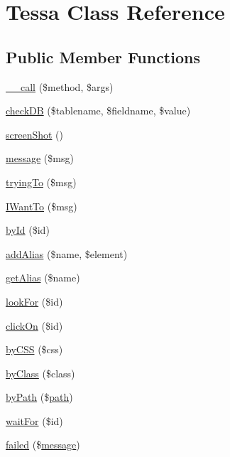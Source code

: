 \hypertarget{classTessa}{}\section{Tessa Class Reference}
\label{classTessa}
\subsection*{Public Member Functions}
\begin{DoxyCompactItemize}
\item 
\hyperlink{classTessa_ac4ec71dc20d7f8c1494c56115eeb534d}{\+\_\+\+\_\+call} (\$method, \$args)
\item 
\hyperlink{classTessa_a54a265707312dd6c5ec290d4877ec05a}{check\+D\+B} (\$tablename, \$fieldname, \$value)
\item 
\hyperlink{classTessa_a410bf71687fffc9d1c5bd674df222eba}{screen\+Shot} ()
\item 
\hyperlink{classTessa_a7e4c039b8228d75810747b96b5062366}{message} (\$msg)
\item 
\hyperlink{classTessa_ac95db31344f3edd1c2951ce6e0f585db}{trying\+To} (\$msg)
\item 
\hyperlink{classTessa_a9996261064c450e61e6530ec0441b945}{I\+Want\+To} (\$msg)
\item 
\hyperlink{classTessa_ae146b22ed7951b61143efd7073d0ea2c}{by\+Id} (\$id)
\item 
\hyperlink{classTessa_aafeac59dfa47fb1501a521bcf9438f15}{add\+Alias} (\$name, \$element)
\item 
\hyperlink{classTessa_a5bf96722ac914ff51e848b14891fb2c0}{get\+Alias} (\$name)
\item 
\hyperlink{classTessa_a1d6ad14ab105a7524cb4f08bfd1d73ca}{look\+For} (\$id)
\item 
\hyperlink{classTessa_a983d3117227db7bf254466936aa8a989}{click\+On} (\$id)
\item 
\hyperlink{classTessa_af0f1f7c19711f0527bd1372a096038bd}{by\+C\+S\+S} (\$css)
\item 
\hyperlink{classTessa_ac535720770b7bed0ea1120aa121c7ea8}{by\+Class} (\$class)
\item 
\hyperlink{classTessa_a91a3e45138fd2f8325a2a94c4a6ba617}{by\+Path} (\$\hyperlink{Shape_8php_a3b05eec13add53df44e232273d718ae4}{path})
\item 
\hyperlink{classTessa_a71e812fa28e3bdb00c6b2b2ee99cbead}{wait\+For} (\$id)
\item 
\hyperlink{classTessa_a3454246c38eb3976f01d1e9db22cdc4f}{failed} (\$\hyperlink{classTessa_a7e4c039b8228d75810747b96b5062366}{message})

\end{DoxyCompactItemize}
